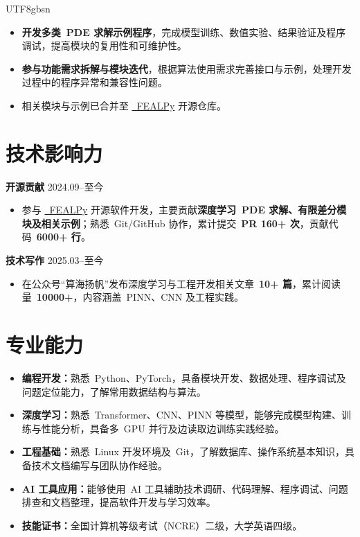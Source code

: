 \documentclass[10.5pt,a4paper]{article}
\newcommand{\resumeItem}[1]{\item #1}
\newcommand{\subTitle}[2]{
  \textbf{#1}
  \hfill
  #2
}
\begin{document}
\begin{CJK*}{UTF8}{gbsn}
\begin{itemize}
\resumeItem{\textbf{开发多类\ PDE 求解示例程序}，完成模型训练、数值实验、结果验证及程序调试，提高模块的复用性和可维护性。}

\resumeItem{\textbf{参与功能需求拆解与模块迭代}，根据算法使用需求完善接口与示例，处理开发过程中的程序异常和兼容性问题。}

\resumeItem{相关模块与示例已合并至
\href{https://github.com/chenchunmei-daphne/fealpy}{\ FEALPy} 开源仓库。}
\end{itemize}

\vspace{0.7em}

\section*{技术影响力}

\subTitle{开源贡献}{2024.09--至今}

\begin{itemize}

\resumeItem{参与
\href{https://github.com/chenchunmei-daphne/fealpy}{\ FEALPy}
开源软件开发，主要贡献\textbf{深度学习\ PDE 求解、有限差分模块及相关示例}；熟悉\ Git/GitHub 协作，累计提交\ \textbf{PR 160+ 次}，贡献代码\ \textbf{6000+ 行}。}

\end{itemize}

\vspace{0.20em}

\subTitle{技术写作}{2025.03--至今}

\begin{itemize}

\resumeItem{在公众号“算海扬帆”发布深度学习与工程开发相关文章\ \textbf{10+ 篇}，累计阅读量\ \textbf{10000+}，内容涵盖\ PINN、CNN 及工程实践。}

\end{itemize}

\section*{专业能力}

\begin{itemize}

\resumeItem{\textbf{编程开发：}熟悉\ Python、PyTorch，具备模块开发、数据处理、程序调试及问题定位能力，了解常用数据结构与算法。}

\resumeItem{\textbf{深度学习：}熟悉\ Transformer、CNN、PINN 等模型，能够完成模型构建、训练与性能分析，具备多\ GPU 并行及边读取边训练实践经验。}

\resumeItem{\textbf{工程基础：}熟悉\ Linux 开发环境及\ Git，了解数据库、操作系统基本知识，具备技术文档编写与团队协作经验。}

\resumeItem{\textbf{AI 工具应用：}能够使用\ AI 工具辅助技术调研、代码理解、程序调试、问题排查和文档整理，提高软件开发与学习效率。}

\resumeItem{\textbf{技能证书：}全国计算机等级考试（NCRE）二级，大学英语四级。}

\end{itemize}

\end{CJK*}
\end{document}
